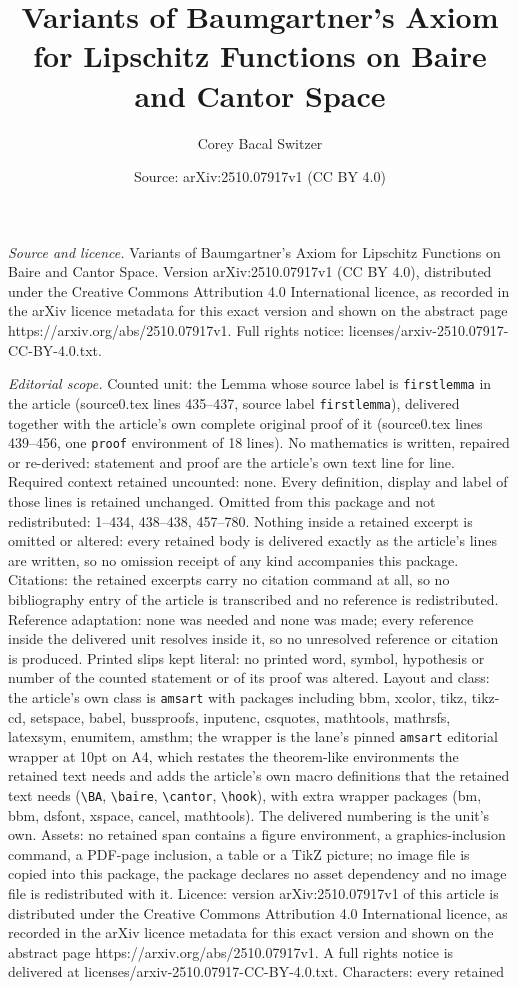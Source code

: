 \documentclass[10pt,a4paper]{amsart}
\title[Variants of Baumgartner's Axiom for Lipschitz Functions on B]{Variants of Baumgartner's Axiom for Lipschitz Functions on Baire and Cantor Space}
\author{Corey Bacal Switzer}
\date{Source: arXiv:2510.07917v1 (CC BY 4.0)}
\begin{document}
\maketitle

\noindent\emph{Source and licence.} Variants of Baumgartner's Axiom for Lipschitz Functions on Baire and Cantor Space. Version arXiv:2510.07917v1 (CC BY 4.0), distributed under the Creative Commons Attribution 4.0 International licence, as recorded in the arXiv licence metadata for this exact version and shown on the abstract page https://arxiv.org/abs/2510.07917v1. Full rights notice: licenses/arxiv-2510.07917-CC-BY-4.0.txt.\par\smallskip

\noindent\textit{Editorial scope.} Counted unit: the Lemma whose source label is \texttt{firstlemma} in the article (source0.tex lines 435--437, source label \texttt{firstlemma}), delivered together with the article's own complete original proof of it (source0.tex lines 439--456, one \texttt{proof} environment of 18 lines). No mathematics is written, repaired or re-derived: statement and proof are the article's own text line for line. Required context retained uncounted: none. Every definition, display and label of those lines is retained unchanged. Omitted from this package and not redistributed: 1--434, 438--438, 457--780. Nothing inside a retained excerpt is omitted or altered: every retained body is delivered exactly as the article's lines are written, so no omission receipt of any kind accompanies this package. Citations: the retained excerpts carry no citation command at all, so no bibliography entry of the article is transcribed and no reference is redistributed. Reference adaptation: none was needed and none was made; every reference inside the delivered unit resolves inside it, so no unresolved reference or citation is produced. Printed slips kept literal: no printed word, symbol, hypothesis or number of the counted statement or of its proof was altered. Layout and class: the article's own class is \texttt{amsart} with packages including bbm, xcolor, tikz, tikz-cd, setspace, babel, bussproofs, inputenc, csquotes, mathtools, mathrsfs, latexsym, enumitem, amsthm; the wrapper is the lane's pinned \texttt{amsart} editorial wrapper at 10pt on A4, which restates the theorem-like environments the retained text needs and adds the article's own macro definitions that the retained text needs (\texttt{\textbackslash BA}, \texttt{\textbackslash baire}, \texttt{\textbackslash cantor}, \texttt{\textbackslash hook}), with extra wrapper packages (bm, bbm, dsfont, xspace, cancel, mathtools). The delivered numbering is the unit's own. Assets: no retained span contains a figure environment, a graphics-inclusion command, a PDF-page inclusion, a table or a TikZ picture; no image file is copied into this package, the package declares no asset dependency and no image file is redistributed with it. Licence: version arXiv:2510.07917v1 of this article is distributed under the Creative Commons Attribution 4.0 International licence, as recorded in the arXiv licence metadata for this exact version and shown on the abstract page https://arxiv.org/abs/2510.07917v1. A full rights notice is delivered at licenses/arxiv-2510.07917-CC-BY-4.0.txt. Characters: every retained 
\end{document}
